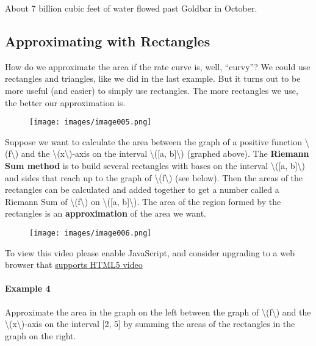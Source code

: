 About 7 billion cubic feet of water flowed past Goldbar in October.

\hypertarget{approximating-with-rectangles}{%
\subsection{Approximating with
Rectangles}\label{approximating-with-rectangles}}

How do we approximate the area if the rate curve is, well, ``curvy''? We
could use rectangles and triangles, like we did in the last example. But
it turns out to be more useful (and easier) to simply use rectangles.
The more rectangles we use, the better our approximation is.

\begin{figure}
\centering
\texttt{[image: images/image005.png]}
\caption{}
\end{figure}

Suppose we want to calculate the area between the graph of a positive
function \textbackslash{}(f\textbackslash{}) and the
\textbackslash{}(x\textbackslash{})-axis on the interval
\textbackslash{}({[}a, b{]}\textbackslash{}) (graphed above). The
\textbf{Riemann Sum method} is to build several rectangles with bases on
the interval \textbackslash{}({[}a, b{]}\textbackslash{}) and sides that
reach up to the graph of \textbackslash{}(f\textbackslash{}) (see
below). Then the areas of the rectangles can be calculated and added
together to get a number called a Riemann Sum of
\textbackslash{}(f\textbackslash{}) on \textbackslash{}({[}a,
b{]}\textbackslash{}). The area of the region formed by the rectangles
is an \textbf{approximation} of the area we want.

\begin{figure}
\centering
\texttt{[image: images/image006.png]}
\caption{}
\end{figure}

To view this video please enable JavaScript, and consider upgrading to a
web browser that \href{http://videojs.com/html5-video-support/}{supports
HTML5 video}

\hypertarget{example-4}{%
\paragraph{Example 4}\label{example-4}}

Approximate the area in the graph on the left between the graph of
\textbackslash{}(f\textbackslash{}) and the
\textbackslash{}(x\textbackslash{})-axis on the interval {[}2, 5{]} by
summing the areas of the rectangles in the graph on the right.

